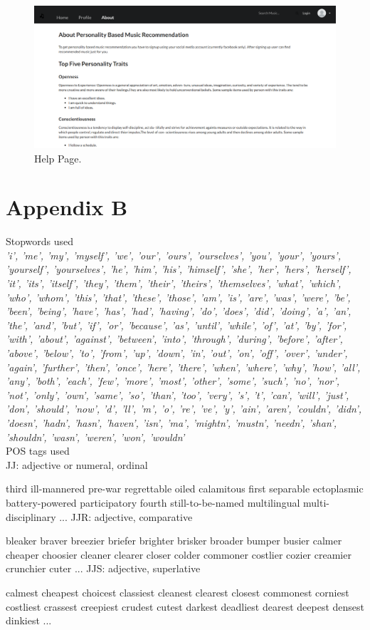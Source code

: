 \newpage
\begin{figure}[h]
  \centering
    \includegraphics[width=1\textwidth]{fig/help_screenshot.png}
    \caption{Help Page.}
\end{figure}

\newpage
\section*{Appendix B}
Stopwords used\\
{\em 'i', 'me', 'my', 'myself', 'we', 'our', 'ours', 'ourselves', 'you', 'your', 'yours', 'yourself', 'yourselves', 'he', 'him', 'his', 'himself', 'she', 'her', 'hers', 'herself', 'it', 'its', 'itself', 'they', 'them', 'their', 'theirs', 'themselves', 'what', 'which', 'who', 'whom', 'this', 'that', 'these', 'those', 'am', 'is', 'are', 'was', 'were', 'be', 'been', 'being', 'have', 'has', 'had', 'having', 'do', 'does', 'did', 'doing', 'a', 'an', 'the', 'and', 'but', 'if', 'or', 'because', 'as', 'until', 'while', 'of', 'at', 'by', 'for', 'with', 'about', 'against', 'between', 'into', 'through', 'during', 'before', 'after', 'above', 'below', 'to', 'from', 'up', 'down', 'in', 'out', 'on', 'off', 'over', 'under', 'again', 'further', 'then', 'once', 'here', 'there', 'when', 'where', 'why', 'how', 'all', 'any', 'both', 'each', 'few', 'more', 'most', 'other', 'some', 'such', 'no', 'nor', 'not', 'only', 'own', 'same', 'so', 'than', 'too', 'very', 's', 't', 'can', 'will', 'just', 'don', 'should', 'now', 'd', 'll', 'm', 'o', 're', 've', 'y', 'ain', 'aren', 'couldn', 'didn', 'doesn', 'hadn', 'hasn', 'haven', 'isn', 'ma', 'mightn', 'mustn', 'needn', 'shan', 'shouldn', 'wasn', 'weren', 'won', 'wouldn'}\\

POS tags used\\
JJ: adjective or numeral, ordinal

third ill-mannered pre-war regrettable oiled calamitous first separable
ectoplasmic battery-powered participatory fourth still-to-be-named
multilingual multi-disciplinary ...
JJR: adjective, comparative

bleaker braver breezier briefer brighter brisker broader bumper busier
calmer cheaper choosier cleaner clearer closer colder commoner costlier
cozier creamier crunchier cuter ...
JJS: adjective, superlative

calmest cheapest choicest classiest cleanest clearest closest commonest
corniest costliest crassest creepiest crudest cutest darkest deadliest
dearest deepest densest dinkiest ...

